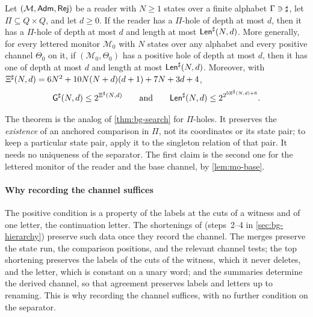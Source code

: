 \begin{theorem}\label{thm:mo-anchored}
Let $(\mathcal M,\mathsf{Adm},\mathsf{Rej})$ be a reader with $N\ge1$ states over a finite
alphabet $\Gamma\ni\sharp$, let $\Pi\subseteq Q\times Q$, and let $d\ge0$. If the
reader has a $\Pi$-hole of depth at most $d$, then it has a $\Pi$-hole of depth
at most $d$ and length at most $\mathsf{Len}^{\sharp}(N,d)$. More generally, for every
lettered monitor $\mathcal M_0$ with $N$ states over any alphabet and every
positive channel $\Theta_0$ on it, if $(\mathcal M_0,\Theta_0)$ has a positive
hole of depth at most $d$, then it has one of depth at most $d$ and length at
most $\mathsf{Len}^{\sharp}(N,d)$. Moreover, with
$\Xi^{\sharp}(N,d)=6N^2+10N(N+d)(d+1)+7N+3d+4$,
\[
 \mathsf{G}^{\sharp}(N,d)\le2^{\Xi^{\sharp}(N,d)}
 \qquad\text{and}\qquad
 \mathsf{Len}^{\sharp}(N,d)\le2^{2^{5\Xi^{\sharp}(N,d)+6}} .
\]
\end{theorem}

The theorem is the analog of \cref{thm:bg-search} for $\Pi$-holes. It
preserves the \emph{existence} of an anchored comparison in $\Pi$, not its
coordinates or its state pair; to keep a particular state pair, apply it to
the singleton relation of that pair. It needs no uniqueness of the separator.
The first claim is the second one for the lettered monitor of the reader and
the base channel, by \cref{lem:mo-base}.

\paragraph{Why recording the channel suffices}
The positive condition is a property of the labels at the cuts of a witness
and of one letter, the continuation letter. The shortenings of \citet{Zhao26}
(steps~2--4 in \cref{sec:bg-hierarchy}) preserve such data once they record
the channel. The merges preserve the state run, the comparison positions, and
the relevant channel tests; the top shortening preserves the labels of the
cuts of the witness, which it never deletes, and the letter, which is constant
on a unary word; and the
summaries determine the derived channel, so that agreement preserves labels
and letters up to renaming. This is why recording the channel suffices, with
no further condition on the separator.

